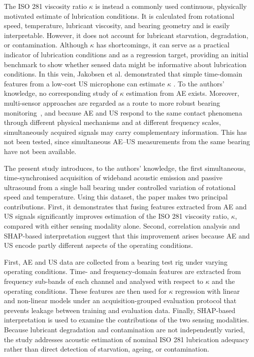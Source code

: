 The ISO 281 viscosity ratio $\kappa$ is instead a commonly used continuous, physically motivated estimate of lubrication conditions. It is calculated from rotational speed, temperature, lubricant viscosity, and bearing geometry and is easily interpretable. However, it does not account for lubricant starvation, degradation, or contamination. Although $\kappa$ has shortcomings, it can serve as a practical indicator of lubrication conditions and as a regression target, providing an initial benchmark to show whether sensed data might be informative about lubrication conditions. In this vein, Jakobsen et al. demonstrated that simple time-domain features from a low-cost US microphone can estimate $\kappa$ \cite{jakobsen_detecting_2023}. To the authors' knowledge, no corresponding study of $\kappa$ estimation from AE exists. Moreover, multi-sensor approaches are regarded as a route to more robust bearing monitoring~\cite{wang_advanced_2024}, and because AE and US respond to the same contact phenomena through different physical mechanisms and at different frequency scales, simultaneously acquired signals may carry complementary information. This has not been tested, since simultaneous AE--US measurements from the same bearing have not been available.

The present study introduces, to the authors' knowledge, the first simultaneous, time-synchronised acquisition of wideband acoustic emission and passive ultrasound from a single ball bearing under controlled variation of rotational speed and temperature. Using this dataset, the paper makes two principal contributions. First, it demonstrates that fusing features extracted from AE and US signals significantly improves estimation of the ISO 281 viscosity ratio, $\kappa$, compared with either sensing modality alone. Second, correlation analysis and SHAP-based interpretation suggest that this improvement arises because AE and US encode partly different aspects of the operating conditions.

First, AE and US data are collected from a bearing test rig under varying operating conditions. Time- and frequency-domain features are extracted from frequency sub-bands of each channel and analysed with respect to $\kappa$ and the operating conditions. These features are then used for $\kappa$ regression with linear and non-linear models under an acquisition-grouped evaluation protocol that prevents leakage between training and evaluation data. Finally, SHAP-based interpretation is used to examine the contributions of the two sensing modalities. Because lubricant degradation and contamination are not independently varied, the study addresses acoustic estimation of nominal ISO 281 lubrication adequacy rather than direct detection of starvation, ageing, or contamination.

